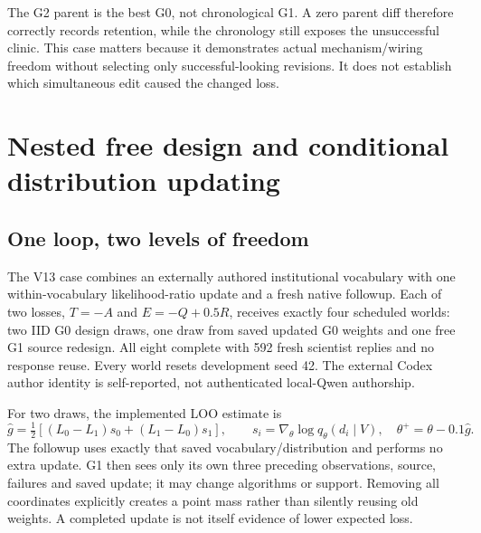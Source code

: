 The G2 parent is the best G0, not chronological G1. A zero parent diff therefore
correctly records retention, while the chronology still exposes the unsuccessful
clinic. This case matters because it demonstrates actual mechanism/wiring
freedom without selecting only successful-looking revisions. It does not
establish which simultaneous edit caused the changed loss.

\section{Nested free design and conditional distribution updating}
\label{sec:nested}
\subsection{One loop, two levels of freedom}
The V13 case combines an externally authored institutional vocabulary with
one within-vocabulary likelihood-ratio update and a fresh native followup.
Each of two losses, $T=-A$ and $E=-Q+0.5R$, receives exactly four scheduled
worlds: two IID G0 design draws, one draw from saved updated G0 weights and
one free G1 source redesign. All eight complete with 592 fresh scientist replies
and no response reuse. Every world resets development seed 42. The external
Codex author identity is self-reported, not authenticated local-Qwen authorship.

For two draws, the implemented LOO estimate is
\begin{equation}
 \widehat g=\tfrac 12\left[(L_0-L_1)s_0+(L_1-L_0)s_1\right],\qquad
 s_i=\nabla_\theta\log q_\theta(d_i\mid V),\quad
 \theta^+=\theta-0.1\widehat g.
\end{equation}
The followup uses exactly that saved vocabulary/distribution and performs no
extra update. G1 then sees only its own three preceding observations, source,
failures and saved update; it may change algorithms or support. Removing all
coordinates explicitly creates a point mass rather than silently reusing old
weights. A completed update is not itself evidence of lower expected loss.

